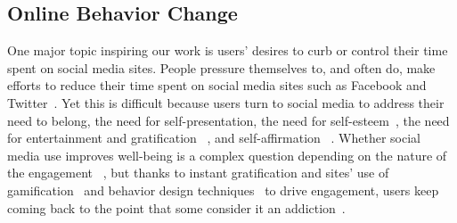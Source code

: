 \subsection{Online Behavior Change}

One major topic inspiring our work is users' desires to curb or control their time spent on social media sites. People pressure themselves to, and often do, make efforts to reduce their time spent on social media sites such as Facebook and Twitter~\cite{Sleeper:2015:ILI:2675133.2675193,schoenebeck2014giving}. Yet this is difficult because users turn to social media to address their need to belong, the need for self-presentation, the need for self-esteem~\cite{nadkarni2012people}, the need for entertainment and gratification ~\cite{raacke2008myspace}, and self-affirmation ~\cite{toma2013self}. Whether social media use improves well-being is a complex question depending on the nature of the engagement ~\cite{uysal2013mediating, marche2012facebook, lin2015emotional, kim2011facebook, muise2009more, sagioglou2014facebook, tandoc2015facebook}, but thanks to instant gratification and sites' use of gamification~\cite{chou2015actionable, zichermann2011gamification, huotari2012defining} and behavior design techniques~\cite{fogg2002persuasive, eyal2014hooked} to drive engagement, users keep coming back to the point that some consider it an addiction~\cite{andreassen2012development, ryan2014uses, tang2016personality, turel2014examination}. %




